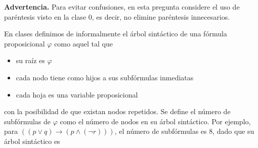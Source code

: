 

\newcommand{\largo}{\text{la}}
\newcommand{\nsf}{\text{nsf}}

\textbf{Advertencia.} Para evitar confusiones, en esta pregunta considere el uso de paréntesis visto en la clase 0, es decir, no elimine paréntesis innecesarios.\medskip

En clases definimos de informalmente el árbol sintáctico de una fórmula proposicional $\varphi$ como aquel tal que
\begin{itemize}
	\item su raíz es $\varphi$
	\item cada nodo tiene como hijos a sus subfórmulas inmediatas
	\item cada hoja es una variable proposicional
\end{itemize}
con la posibilidad de que existan nodos repetidos. Se define el número de subfórmulas de $\varphi$ como el número de nodos en su árbol sintáctico.
Por ejemplo, para $((p \vee q) \to (p \wedge (\neg r)))$, el número de subfórmulas es 8, dado que su árbol sintáctico es 

\begin{center}
	
\end{center}


